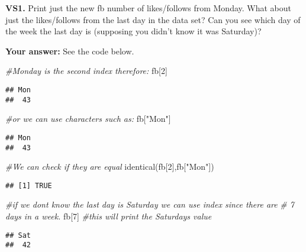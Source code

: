 \documentclass[
]{article}
\newenvironment{Shaded}{\begin{snugshade}}{\end{snugshade}}
\newcommand{\CommentTok}[1]{\textcolor[rgb]{0.56,0.35,0.01}{\textit{#1}}}
\newcommand{\DecValTok}[1]{\textcolor[rgb]{0.00,0.00,0.81}{#1}}
\newcommand{\FunctionTok}[1]{\textcolor[rgb]{0.00,0.00,0.00}{#1}}
\newcommand{\NormalTok}[1]{#1}
\newcommand{\StringTok}[1]{\textcolor[rgb]{0.31,0.60,0.02}{#1}}
\begin{document}
\textbf{VS1.} Print just the new fb number of likes/follows from Monday.
What about just the likes/follows from the last day in the data set? Can
you see which day of the week the last day is (supposing you didn't know
it was Saturday)?

\textbf{Your answer:} See the code below.

\begin{Shaded}
\begin{Highlighting}[]
\CommentTok{\#Monday is the second index therefore:}
\NormalTok{fb[}\DecValTok{2}\NormalTok{]}
\end{Highlighting}
\end{Shaded}

\begin{verbatim}
## Mon 
##  43
\end{verbatim}

\begin{Shaded}
\begin{Highlighting}[]
\CommentTok{\#or we can use characters such as:}
\NormalTok{fb[}\StringTok{"Mon"}\NormalTok{]}
\end{Highlighting}
\end{Shaded}

\begin{verbatim}
## Mon 
##  43
\end{verbatim}

\begin{Shaded}
\begin{Highlighting}[]
\CommentTok{\#We can check if they are equal }
\FunctionTok{identical}\NormalTok{(fb[}\DecValTok{2}\NormalTok{],fb[}\StringTok{"Mon"}\NormalTok{])}
\end{Highlighting}
\end{Shaded}

\begin{verbatim}
## [1] TRUE
\end{verbatim}

\begin{Shaded}
\begin{Highlighting}[]
\CommentTok{\#if we don\textquotesingle{}t know the last day is Saturday we can use index since there are}
\CommentTok{\# 7 days in a week.}
\NormalTok{fb[}\DecValTok{7}\NormalTok{] }\CommentTok{\#this will print the Saturday\textquotesingle{}s value}
\end{Highlighting}
\end{Shaded}

\begin{verbatim}
## Sat 
##  42
\end{verbatim}
\end{document}
